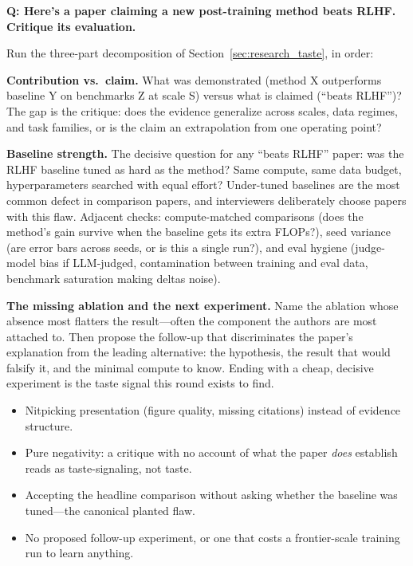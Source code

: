 \begin{interviewq}
\textbf{Q: Here's a paper claiming a new post-training method beats RLHF. Critique its evaluation.}

 \quad {} \quad \badgefreq{\freqmed}

\stronganswer

Run the three-part decomposition of Section~\ref{sec:research_taste}, in order:

\textbf{Contribution vs.\ claim.} What was demonstrated (method X outperforms baseline Y on benchmarks Z at scale S) versus what is claimed (``beats RLHF'')? The gap is the critique: does the evidence generalize across scales, data regimes, and task families, or is the claim an extrapolation from one operating point?

\textbf{Baseline strength.} The decisive question for any ``beats RLHF'' paper: was the RLHF baseline tuned as hard as the method? Same compute, same data budget, hyperparameters searched with equal effort? Under-tuned baselines are the most common defect in comparison papers, and interviewers deliberately choose papers with this flaw. Adjacent checks: compute-matched comparisons (does the method's gain survive when the baseline gets its extra FLOPs?), seed variance (are error bars across seeds, or is this a single run?), and eval hygiene (judge-model bias if LLM-judged, contamination between training and eval data, benchmark saturation making deltas noise).

\textbf{The missing ablation and the next experiment.} Name the ablation whose absence most flatters the result---often the component the authors are most attached to. Then propose the follow-up that discriminates the paper's explanation from the leading alternative: the hypothesis, the result that would falsify it, and the minimal compute to know. Ending with a cheap, decisive experiment is the taste signal this round exists to find.

\redflags
\begin{itemize}
    \item Nitpicking presentation (figure quality, missing citations) instead of evidence structure.
    \item Pure negativity: a critique with no account of what the paper \textit{does} establish reads as taste-signaling, not taste.
    \item Accepting the headline comparison without asking whether the baseline was tuned---the canonical planted flaw.
    \item No proposed follow-up experiment, or one that costs a frontier-scale training run to learn anything.
\end{itemize}


\end{interviewq}
